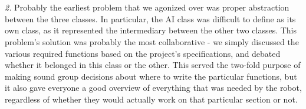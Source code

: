 \documentclass[paper=a4, fontsize=11pt]{scrartcl}
\numberwithin{equation}{section}		%
\numberwithin{figure}{section}			%
\numberwithin{table}{section}				%
\begin{document}
{\\\\
\textit{2. }Probably the earliest problem that we agonized over was proper abstraction between the three classes. In particular, the AI class was difficult to define as its own class, as it represented the intermediary between the other two classes. This problem's solution was probably the most collaborative - we simply discussed the various required functions based on the project's specifications, and debated whether it belonged in this class or the other. This served the two-fold purpose of making sound group decisions about where to write the particular functions, but it also gave everyone a good overview of everything that was needed by the robot, regardless of whether they would actually work on that particular section or not.

}
\end{document}
